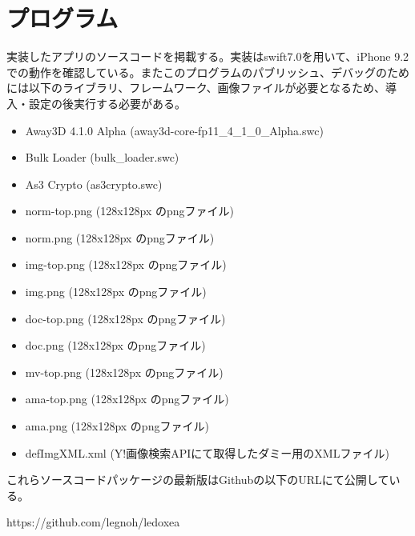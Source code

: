 \chapter{プログラム}
実装したアプリのソースコードを掲載する。実装はswift7.0を用いて、iPhone 9.2での動作を確認している。またこのプログラムのパブリッシュ、デバッグのためには以下のライブラリ、フレームワーク、画像ファイルが必要となるため、導入・設定の後実行する必要がある。
\begin{itemize}
\item Away3D 4.1.0 Alpha (away3d-core-fp11\_4\_1\_0\_Alpha.swc)\cite{away3d}
\item Bulk Loader (bulk\_loader.swc)\cite{bulkloader}
\item As3 Crypto (as3crypto.swc)\cite{as3crypto}
\item norm-top.png (128x128px のpngファイル)
\item norm.png (128x128px のpngファイル)
\item img-top.png (128x128px のpngファイル)
\item img.png (128x128px のpngファイル)
\item doc-top.png (128x128px のpngファイル)
\item doc.png (128x128px のpngファイル)
\item mv-top.png (128x128px のpngファイル)
\item ama-top.png (128x128px のpngファイル)
\item ama.png (128x128px のpngファイル)
\item defImgXML.xml (Y!画像検索APIにて取得したダミー用のXMLファイル)
\end{itemize}

これらソースコードパッケージの最新版はGithubの以下のURLにて公開している。 

https://github.com/legnoh/ledoxea
